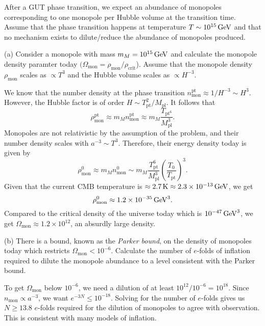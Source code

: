\documentclass{lkx_pset}
\begin{document}
\begin{problem}{3}
  After a GUT phase transition, we expect an abundance of monopoles corresponding to one monopole per Hubble volume at the transition time. Assume that the phase transition happens at temperature $T\sim \GeVsi{e15}$ and that no mechanism exists to dilute/reduce the abundance of monopoles produced.
\end{problem}
\begin{parts}
  \begin{part}{(a)}
  Consider a monopole with mass $m_M = \GeVsi{e15}$ and calculate the monopole density paramter today $(\Omega_{\textrm{mon}}=\rho_{\textrm{mon}} / \rho_{\textrm{crit}}$). Assume that the monopole density $\rho_{\textrm{mon}}$ scales as $\propto T^3$ and the Hubble volume scales as $\propto H^{-3}$.
  \end{part}

  We know that the number density at the phase transition $n_{\textrm{mon}}^{\textrm{pt}} \approx 1/H^{-3}\sim H^3$. However, the Hubble factor is of order $H\sim T_{\textrm{pt}}^2 / M_{\textrm{pl}}$. It follows that
  \[
    \rho_{\textrm{mon}}^{\textrm{pt}} \approx m_M n_{\textrm{mon}}^\textrm{pt} \approx m_M \frac{T_{\textrm{pt}^6}}{M_{\textrm{pl}}^3}.
  \]
  Monopoles are not relativistic by the assumption of the problem, and their number density scales with $a^{-3}\sim T^3$. Therefore, their energy density today is given by
  \[
    \rho_{\textrm{mon}}^0 \approx m_M n_{\textrm{mon}}^0 \sim m_M \frac{T_{\textrm{pt}}^6}{M_{\textrm{pl}}^3}\left(\frac{T_0}{T_{\textrm{pt}}}\right)^3.
  \]
  Given that the current CMB temperature is $\approx \Ksi{2.7}\approx \GeVsi{2.3e-13}$, we get
  \[
  \rho_{\textrm{mon}}^0 \approx \GeVfoursi{1.2e-35}.
  \]
  Compared to the critical density of the universe today which is $\GeVfoursi{e-47}$, we get $\Omega_{\textrm{mon}}\approx 1.2\times 10^12$, an absurdly large density.

  \begin{part}{(b)}
    There is a bound, known as the \emph{Parker bound}, on the density of monopoles today which restricts $\Omega_{\textrm{mon}}<10^{-6}$. Calculate the number of $e$-folds of inflation required to dilute the monopole abundance to a level consistent with the Parker bound.
  \end{part}

  To get $\Omega_{\textrm{mon}}$ below $10^{-6}$, we need a dilution of at least $10^{12}/10^{-6}=10^{18}$. Since $n_{\textrm{mon}}\propto a^{-3}$, we want $e^{-3N}\leq 10^{-18}$. Solving for the number of $e$-folds gives us $N\geq 13.8$ $e$-folds required for the dilution of monopoles to agree with observation. This is consistent with many models of inflation.
\end{parts}
\end{document}
